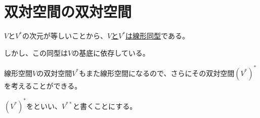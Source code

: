 \documentclass[../../../topic_linear-algebra]{subfiles}
\begin{document}
\sectionline
\section{双対空間の双対空間}

$V$と$V^*$の次元が等しいことから、\hyperref[thm:abstract-linear-pigeonhole]{$V$と$V^*$は線形同型}である。

しかし、この同型は$V$の基底に依存している。

\br

線形空間$V$の双対空間$V^*$もまた線形空間になるので、さらにその双対空間$(V^*)^*$を考えることができる。

$(V^*)^*$をといい、$V^{**}$と書くことにする。
\end{document}

